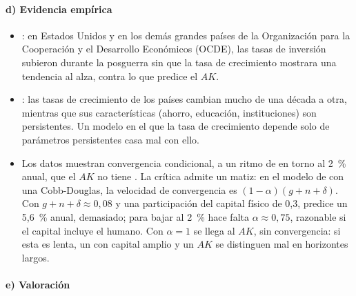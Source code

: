 \documentclass[11pt]{article}
\begin{document}
\paragraph{d) Evidencia empírica}

\begin{itemize}
\item \textcite{Jones1995QJE}: en Estados Unidos y en los demás grandes países de la Organización para la Cooperación y el Desarrollo Económicos (OCDE), las tasas de inversión subieron durante la posguerra sin que la tasa de crecimiento mostrara una tendencia al alza, contra lo que predice el $AK$.
\item \textcite{EasterlyEtAl1993Good}: las tasas de crecimiento de los países cambian mucho de una década a otra, mientras que sus características (ahorro, educación, instituciones) son persistentes. Un modelo en el que la tasa de crecimiento depende solo de parámetros persistentes casa mal con ello.
\item Los datos muestran convergencia condicional, a un ritmo de en torno al 2~\% anual\nocite{BarroSalaiMartin1992}, que el $AK$ no tiene . La crítica admite un matiz: en el modelo de  con una Cobb-Douglas, la velocidad de convergencia es $(1-\alpha)(g+n+\delta)$. Con $g+n+\delta\approx0{,}08$ y una participación del capital físico de 0,3, predice un 5,6~\% anual, demasiado; para bajar al 2~\% hace falta $\alpha\approx0{,}75$, razonable si el capital incluye el humano. Con $\alpha=1$ se llega al $AK$, sin convergencia: si esta es lenta, un  con capital amplio y un $AK$ se distinguen mal en horizontes largos\nocite{BarroSalaiMartin2004}.
\end{itemize}

\paragraph{e) Valoración}
\end{document}

